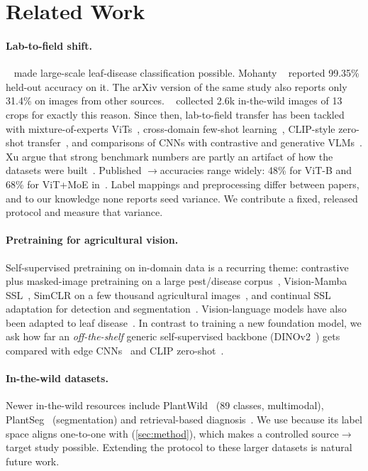 \section{Related Work}
\label{sec:related}

\paragraph{Lab-to-field shift.}
\PV~\cite{hughes2015an} made large-scale leaf-disease classification possible. Mohanty \etal~\cite{mohanty2016using} reported 99.35\% held-out accuracy on it. The arXiv version of the same study also reports only 31.4\% on images from other sources.
\PD~\cite{singh2020plantdoc} collected 2.6k in-the-wild images of 13 crops for exactly this reason. Since then, lab-to-field transfer has been tackled with mixture-of-experts ViTs~\cite{salman2025plant}, cross-domain few-shot learning~\cite{yang2024laboratory}, CLIP-style zero-shot transfer~\cite{benabbas2025rethinking}, and comparisons of CNNs with contrastive and generative VLMs~\cite{mooraj2026agripath}.
Xu \etal argue that strong benchmark numbers are partly an artifact of how the datasets were built~\cite{xu2023plant,xu2023embrace}.
Published \PV$\rightarrow$\PD accuracies range widely: 48\% for ViT-B and 68\% for ViT+MoE in~\cite{salman2025plant}. Label mappings and preprocessing differ between papers, and to our knowledge none reports seed variance. We contribute a fixed, released protocol and measure that variance.

\paragraph{Pretraining for agricultural vision.}
Self-supervised pretraining on in-domain data is a recurring theme: contrastive plus masked-image pretraining on a large pest/disease corpus~\cite{wang2024selfsupervised}, Vision-Mamba SSL~\cite{mamun2025psmamba,mamun2025statespacessl}, SimCLR on a few thousand agricultural images~\cite{sonavane2026domainspecific}, and continual SSL adaptation for detection and segmentation~\cite{nahian2025agrifm}. Vision-language models have also been adapted to leaf disease~\cite{quoc2025a}.
In contrast to training a new foundation model, we ask how far an \emph{off-the-shelf} generic self-supervised backbone (DINOv2~\cite{oquab2023dinov}) gets compared with edge CNNs~\cite{howard2019searching,tan2019efficientnet} and CLIP zero-shot~\cite{radford2021learning}.

\paragraph{In-the-wild datasets.}
Newer in-the-wild resources include PlantWild~\cite{wei2024benchmarking} (89 classes, multimodal), PlantSeg~\cite{wei2024plantseg} (segmentation) and retrieval-based diagnosis~\cite{wei2024snap}. We use \PD because its label space aligns one-to-one with \PV (\cref{sec:method}), which makes a controlled source$\rightarrow$target study possible. Extending the protocol to these larger datasets is natural future work.

